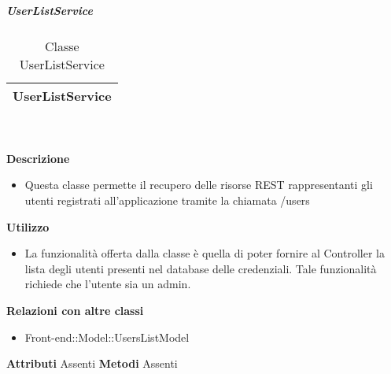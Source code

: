 			\subparagraph{UserListService} 
\begin{table}[ht]
\begin{center}
\bgroup
	\setlength{\arrayrulewidth}{0.6mm}
	\def\arraystretch{1}
		\begin{tabular}{ | p{12cm} | }
				\hline  
					\centerline{\textbf{UserListService}}
		\\ \hline 
				\hline
				\hline
		
		\end{tabular}
\egroup
\caption{Classe UserListService}
\end{center}
\end{table} \textbf{\\ \\ Descrizione}
\begin{itemize}
\item[] Questa classe permette il recupero delle risorse REST rappresentanti gli utenti registrati all'applicazione tramite la chiamata /users
\end{itemize} 
\textbf{Utilizzo}
\begin{itemize}
\item[] La funzionalità offerta dalla classe è quella di poter fornire al Controller la lista degli utenti presenti nel database delle credenziali.
Tale funzionalità richiede che l'utente sia un admin.
\end{itemize}
\textbf{Relazioni con altre classi}
\begin{itemize}
\item{Front-end::Model::UsersListModel}
\end{itemize}
\textbf{Attributi}
Assenti
\textbf{Metodi}
Assenti

